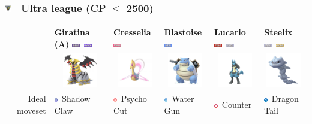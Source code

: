\documentclass[8pt,aspectratio=169,compress]{beamer}
\newcommand{\fightingfull}{\includegraphics[height=0.15cm]{../../images/type/full/Fighting.png}}
\newcommand{\ghostfull}{\includegraphics[height=0.15cm]{../../images/type/full/Ghost.png}}
\newcommand{\dragonfull}{\includegraphics[height=0.15cm]{../../images/type/full/Dragon.png}}
\newcommand{\groundfull}{\includegraphics[height=0.15cm]{../../images/type/full/Ground.png}}
\newcommand{\psychicfull}{\includegraphics[height=0.15cm]{../../images/type/full/Psychic.png}}
\newcommand{\waterfull}{\includegraphics[height=0.15cm]{../../images/type/full/Water.png}}
\newcommand{\steelfull}{\includegraphics[height=0.15cm]{../../images/type/full/Steel.png}}
\newcommand{\fightingsimp}{\includegraphics[height=0.15cm]{../../images/type/simplified/fighting.png}}
\newcommand{\dragonsimp}{\includegraphics[height=0.15cm]{../../images/type/simplified/dragon.png}}
\newcommand{\ghostsimp}{\includegraphics[height=0.15cm]{../../images/type/simplified/ghost.png}}
\newcommand{\psysimp}{\includegraphics[height=0.15cm]{../../images/type/simplified/psy.png}}
\newcommand{\watersimp}{\includegraphics[height=0.15cm]{../../images/type/simplified/water.png}}
\begin{document}
\begin{frame}
\frametitle{\includegraphics[width=0.3cm]{../../images/league/ultra_league.png} ~Ultra league (CP $\leq$ 2500)}

\begin{tiny}
\begin{block}{}
\begin{center}

\begin{tabular}{rp{2cm}p{2cm}p{2cm}p{2cm}p{2cm}} 
  & \textbf{Giratina (A)} \hfill \ghostfull~\dragonfull& \textbf{Cresselia} \hfill \psychicfull & \textbf{Blastoise} \hfill\waterfull &\textbf{Lucario} \hfill\fightingfull~\steelfull & \textbf{Steelix} \hfill \steelfull~\groundfull \\ 
  & \multicolumn{1}{c}{\includegraphics[width=1.5cm]{../../images/pokemon/giratina_a}} &  \multicolumn{1}{c}{\includegraphics[width=1.5cm]{../../images/pokemon/cresselia} } & \multicolumn{1}{c}{\includegraphics[width=1.5cm]{../../images/pokemon/blastoise} } & \multicolumn{1}{c}{\includegraphics[width=1.5cm]{../../images/pokemon/lucario} } & \multicolumn{1}{c}{\includegraphics[width=1.5cm]{../../images/pokemon/steelix} }  \\ \hline 
   \multirow{3}{*}{Ideal moveset}  & \ghostsimp~Shadow Claw & \psysimp~Psycho Cut & \watersimp~Water Gun & \fightingsimp~Counter & \dragonsimp~Dragon Tail \\

\end{tabular}
\end{center}
\end{block}
\end{tiny}
\end{frame}
\end{document}
